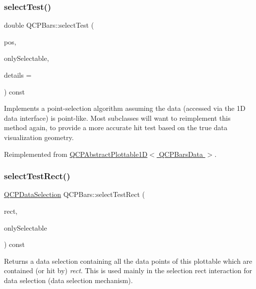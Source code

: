 \subsubsection{\texorpdfstring{select\+Test()}{selectTest()}\hspace{0.1cm}{\footnotesize\ttfamily [2/2]}}
{\footnotesize\ttfamily double Q\+C\+P\+Bars\+::select\+Test (\begin{DoxyParamCaption}\item[{const Q\+PointF \&}]{pos,  }\item[{bool}]{only\+Selectable,  }\item[{Q\+Variant $\ast$}]{details = {} }\end{DoxyParamCaption}) const\hspace{0.3cm}{\ttfamily [virtual]}}

Implements a point-\/selection algorithm assuming the data (accessed via the 1D data interface) is point-\/like. Most subclasses will want to reimplement this method again, to provide a more accurate hit test based on the true data visualization geometry.

Reimplemented from \hyperlink{class_q_c_p_abstract_plottable1_d_a071e2df66ba1746067dfcb5e27947b43}{Q\+C\+P\+Abstract\+Plottable1\+D$<$ Q\+C\+P\+Bars\+Data $>$}.

\mbox{\label{class_q_c_p_bars_ab03bb6125c3e983b89d694f75ce6b3d5}} 
\subsubsection{\texorpdfstring{select\+Test\+Rect()}{selectTestRect()}\hspace{0.1cm}{\footnotesize\ttfamily [1/2]}}
{\footnotesize\ttfamily \hyperlink{class_q_c_p_data_selection}{Q\+C\+P\+Data\+Selection} Q\+C\+P\+Bars\+::select\+Test\+Rect (\begin{DoxyParamCaption}\item[{const Q\+RectF \&}]{rect,  }\item[{bool}]{only\+Selectable }\end{DoxyParamCaption}) const\hspace{0.3cm}{\ttfamily [virtual]}}





Returns a data selection containing all the data points of this plottable which are contained (or hit by) {\itshape rect}. This is used mainly in the selection rect interaction for data selection (data selection mechanism).

